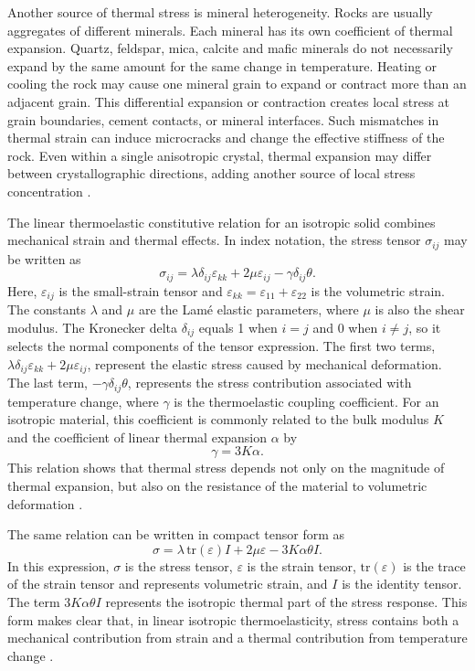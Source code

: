 Another source of thermal stress is mineral heterogeneity. Rocks are usually aggregates of different minerals. Each mineral has its own coefficient of thermal expansion.
Quartz, feldspar, mica, calcite and mafic minerals do not necessarily expand by the same amount for the same change in temperature. Heating or cooling the rock may cause one mineral grain to expand or contract more than an adjacent grain. This differential expansion or contraction creates local stress at grain boundaries, cement contacts, or mineral interfaces. Such mismatches in thermal strain can induce microcracks and change the effective stiffness of the rock. Even within a single anisotropic crystal, thermal expansion may differ between crystallographic directions, adding another source of local stress concentration \cite{robertson1988,mavko2009}.

The linear thermoelastic constitutive relation for an isotropic solid combines mechanical strain and thermal effects. In index notation, the stress tensor \(\sigma_{ij}\) may be written as
\begin{equation}
\label{eq:thermoelastic-constitutive}
\sigma_{ij}
=
\lambda \delta_{ij}\varepsilon_{kk}
+
2\mu\varepsilon_{ij}
-
\gamma\delta_{ij}\theta.
\end{equation}
Here, \(\varepsilon_{ij}\) is the small-strain tensor and \(\varepsilon_{kk} = \varepsilon_{11} + \varepsilon_{22}\) is the volumetric strain. The constants \(\lambda\) and \(\mu\) are the Lamé elastic parameters, where \(\mu\) is also the shear modulus. The Kronecker delta \(\delta_{ij}\) equals 1 when \(i=j\) and 0 when \(i \neq j\), so it selects the normal components of the tensor expression. The first two terms,
\(\lambda \delta_{ij}\varepsilon_{kk} + 2\mu\varepsilon_{ij}\), represent the elastic stress caused by mechanical deformation. The last term,
\(-\gamma\delta_{ij}\theta\), represents the stress contribution associated with temperature change, where \(\gamma\) is the thermoelastic coupling coefficient. For an isotropic material, this coefficient is commonly related to the bulk modulus \(K\) and the coefficient of linear thermal expansion \(\alpha\) by
\begin{equation}
\label{eq:gamma-def}
\gamma = 3K\alpha.
\end{equation}
This relation shows that thermal stress depends not only on the magnitude of thermal expansion, but also on the resistance of the material to volumetric deformation \cite{nowacki1986,jaeger2007}.

The same relation can be written in compact tensor form as
\begin{equation}
\sigma
=
\lambda\,\mathrm{tr}(\varepsilon)I
+
2\mu\varepsilon
-
3K\alpha\theta I.
\end{equation}
In this expression, \(\sigma\) is the stress tensor, \(\varepsilon\) is the strain tensor, \(\mathrm{tr}(\varepsilon)\) is the trace of the strain tensor and represents volumetric strain, and \(I\) is the identity tensor. The term \(3K\alpha\theta I\) represents the isotropic thermal part of the stress response. This form makes clear that, in linear isotropic thermoelasticity, stress contains both a mechanical contribution from strain and a thermal contribution from temperature change \cite{boley1960,nowacki1986}.

